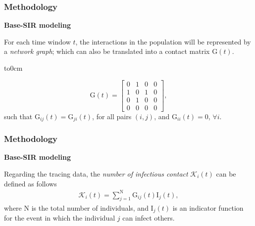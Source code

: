 \documentclass[12pt, aspectratio = 169]{beamer} %
\begin{document}
	\begin{frame}[t]
		\frametitle{Methodology}
		\justifying
		\textcolor{titles}{\textbf{Base-SIR modeling}}
		
		For each time window $t$, the interactions in the population will be represented by a \textit{network graph}; which can also be translated into a contact matrix $\text{G}(t)$.
		
		\begin{minipage}[t]{0.48\linewidth}
			\vbox to0cm{} %
			\centering
		\end{minipage}\hfill \pause
		\begin{minipage}[t]{0.48\linewidth}
			\centering
			\[ \text{G}(t) = 
			\begin{bmatrix}
				0 & 1 & 0 & 0 \\
				1 & 0 & 1 & 0 \\
				0 & 1 & 0 & 0 \\
				0 & 0 & 0 & 0
			\end{bmatrix},
			\]
			\justifying
			such that $\text{G}_{ij}(t) = \text{G}_{ji}(t)$, for all pairs $(i, j)$, \hspace{-2pt}and $\text{G}_{ii}(t) = 0$, $\forall i$.
		\end{minipage}
	\end{frame}

	\begin{frame}[t]
		\frametitle{Methodology}
		\justifying
		\textcolor{titles}{\textbf{Base-SIR modeling}}
		
		Regarding the tracing data, the \textit{number of infectious contact} $\mathcal{K}_i(t)$ can be defined as follows
		\begin{align*}
			\mathcal{K}_i(t) = \sum_{j = 1}^{\text{N}}\text{G}_{ij}(t)\text{I}_j(t) ,
		\end{align*}
		where $\text{N}$ is the total number of individuals, and $\text{I}_{j}(t)$ is an indicator function for the event in which the individual $j$ can infect others.
	\end{frame}
\end{document}
